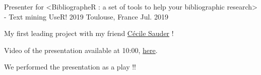 \begin{cventries}
  \cventry
    {Presenter for <BibliographeR : a set of tools to help your bibliographic research>  - Text mining} %
    {UseR! 2019} %
    {Toulouse, France} %
    {Jul. 2019} %
    {
      \begin{cvitems} %
        \item {My first leading project with my friend \href{https://twitter.com/cecilesauder}{Cécile Sauder} !}
        \item {Video of the presentation available at 10:00, \href{https://www.youtube.com/watch?v=6V_nu0K_3mk&list=PL4IzsxWztPdm9_UFnWOCG7Rmw3oW5Fgju}{here}.}
        \item {We performed the presentation as a play !!}
        \\
      \end{cvitems}
    }

\end{cventries}

